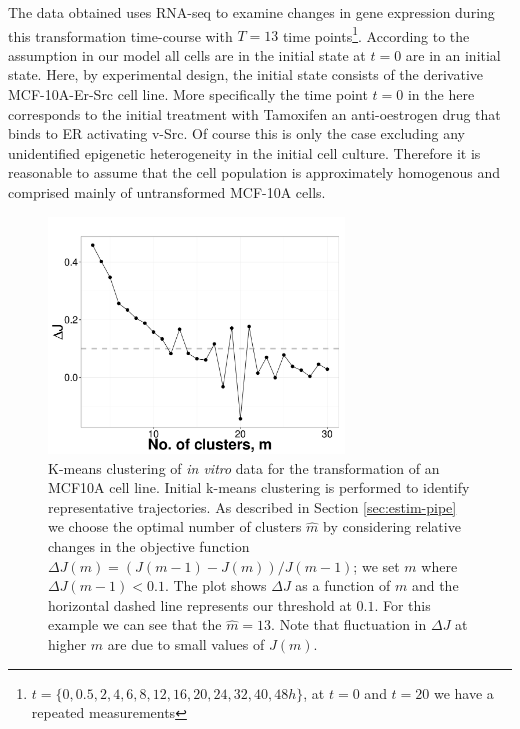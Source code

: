 The data obtained uses RNA-seq to examine changes in gene expression during this transformation time-course with $T=13$ time points\footnote{$t=\lbrace 0, 0.5,  2,  4,  6,  8, 12, 16, 20, 24, 32, 40, 48h \rbrace$, at $t=0$ and $t=20$ we have a repeated measurements}. According to the assumption in our model all cells are in the initial state at $t=0$ are in an initial state. Here, by experimental design, the initial state consists of the derivative MCF-10A-Er-Src cell line. More specifically the time point $t=0$ in the here corresponds to the initial treatment with Tamoxifen an anti-oestrogen drug that binds to ER activating v-Src. Of course this is only the case excluding any unidentified epigenetic heterogeneity in the initial cell culture.  Therefore it is reasonable to assume that the cell population is approximately homogenous and comprised mainly of untransformed MCF-10A cells.


\begin{figure}
  \centering
  \includegraphics[width=0.7\textwidth]{pics/kmeans-dat.pdf}
  \caption{K-means clustering of {\it in vitro} data for the transformation of an MCF10A cell line. Initial k-means clustering is performed to identify representative trajectories. As described in Section \ref{sec:estim-pipe} we choose the optimal number of clusters $\hat{m}$ by considering relative changes in the objective function $\Delta J (m) = (J(m-1) - J(m))/J(m-1)$; we set $m$ where $\Delta J(m-1) < 0.1$. The plot shows $\Delta J$ as a function of $m$ and the horizontal dashed line represents our threshold at $0.1$. For this example we can see that the $\hat{m} = 13$. Note that fluctuation in $\Delta J$ at higher $m$ are due to small values of $J(m)$. }
  \label{fig:kmeans-dat}
\end{figure}


